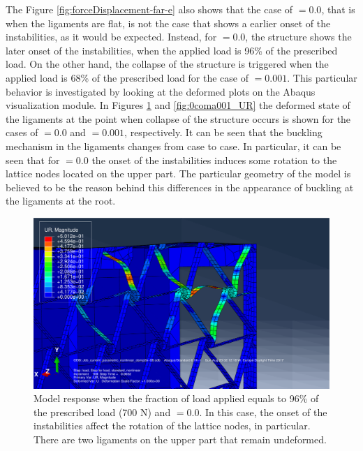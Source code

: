       The Figure \ref{fig:forceDisplacement-far-e} also shows that the case of \chie$ = 0.0$, that is when the ligaments are flat, is not the case that shows a earlier onset of the instabilities, as it would be expected. Instead, for \chie$ = 0.0$, the structure shows the later onset of the instabilities, when the applied load is 96\% of the prescribed load. On the other hand, the collapse of the structure is triggered when the applied load is 68\% of the prescribed load for the case of \chie$ = 0.001$. This particular behavior is investigated by looking at the deformed plots on the Abaqus visualization module. In Figures \ref{fig:0coma0_UR} and \ref{fig:0coma001_UR} the deformed state of the ligaments at the point when collapse of the structure occurs is shown for the cases of \chie$ = 0.0$ and \chie$ = 0.001$, respectively. It can be seen that the buckling mechanism in the ligaments changes from case to case. In particular, it can be seen that for \chie$ = 0.0$ the onset of the instabilities induces some rotation to the lattice nodes located on the upper part. The particular geometry of the model is believed to be the reason behind this differences in the appearance of buckling at the ligaments at the root. 

      \begin{figure}[!htpb] %
        \centering
        \includegraphics[width=0.8 \textwidth]{../figures/result-sim/eccen/0coma0_UR}
        \caption[Model response when the fraction of load applied equals to 96\% of the prescribed load (700 N) and \chie$= 0.0$]{Model response when the fraction of load applied equals to 96\% of the prescribed load (700 N) and \chie$= 0.0$. In this case, the onset of the instabilities affect the rotation of the lattice nodes, in particular. There are two ligaments on the upper part that remain undeformed.}
        \label{fig:0coma0_UR}
      \end{figure}

